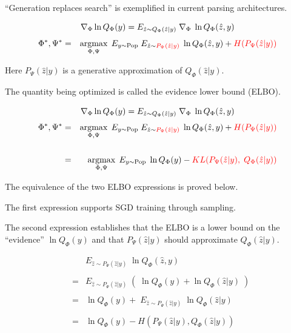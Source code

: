 {\vfill
``Generation replaces search'' is exemplified in current parsing architectures.

\bigskip
$$\nabla_\Phi \ln Q_\Phi(y) = E_{\hat{z} \sim Q_\Phi(\hat{z}|y)}\;\nabla_\Phi \;\ln Q_\Phi(\hat{z},y)$$
\begin{eqnarray*}
\Phi^*,\Psi^* & = & \operatorname*{argmax}_{\Phi,\Psi}\;  E_{y \sim \mathrm{Pop}}\;E_{\hat{z} \sim {\color{red} P_\Psi(\hat{z}|y)}}\;\ln Q_\Phi(\hat{z},y) + {\color{red} H(P_\Psi(\hat{z}|y))}
\end{eqnarray*}

\vfill
Here $P_\Psi(\hat{z}|y)$ is a generative approximation of $Q_\Phi(\hat{z}|y)$.

\vfill
The quantity being optimized is called the evidence lower bound (ELBO).

\bigskip
$$\nabla_\Phi \ln Q_\Phi(y) = E_{\hat{z} \sim Q_\Phi(\hat{z}|y)}\;\nabla_\Phi \;\ln Q_\Phi(\hat{z},y)$$
\begin{eqnarray*}
\Phi^*,\Psi^* & = & \operatorname*{argmax}_{\Phi,\Psi}\; E_{y \sim \mathrm{Pop}}\;  E_{\hat{z} \sim {\color{red} P_\Psi(\hat{z}|y)}}\;\ln Q_\Phi(\hat{z},y) + {\color{red} H( P_\Psi(\hat{z}|y))} \\
\\
& = & \operatorname*{argmax}_{\Phi,\Psi}\;E_{y \sim \mathrm{Pop}}\;\ln Q_\Phi(y) - {\color{red} KL(P_\Psi(\hat{z}|y),\;Q_\Phi(\hat{z}|y))}
\end{eqnarray*}

\vfill
The equivalence of the two ELBO expressions is proved below.

\vfill
The first expression supports SGD training through sampling.

\vfill
The second expression establishes that the ELBO is a lower bound on the ``evidence'' $\ln Q_\Phi(y)$ and that $P_\Psi(\hat{z}|y)$ should approximate $Q_\Phi(\hat{z}|y)$.


\begin{eqnarray*}
  & & E_{\hat{z} \sim P_\Psi(\hat{z}|y)} \;\ln Q_\Phi(\hat{z},y) \\
  \\
  & = & E_{\hat{z} \sim P_\Psi(\hat{z}|y)} \;\left(\;\ln Q_\Phi(y) + \ln Q_\Phi(\hat{z}|y)\;\right) \\
  \\
  & = & \ln Q_\Phi(y) + \;E_{\hat{z} \sim P_\Psi(\hat{z}|y)}\;\ln Q_\Phi(\hat{z}|y) \\
  \\
  & = & \ln Q_\Phi(y) - H(P_\Psi(\hat{z}|y), Q_\Phi(\hat{z}|y))
\end{eqnarray*}

}
